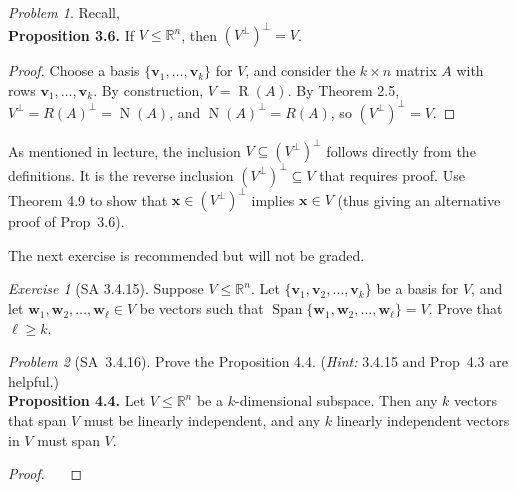 \documentclass[fleqn,11pt]{paper}
\theoremstyle{remark}
\newtheorem{problem}{Problem}
\newtheorem*{exercise}{Exercise}
\newtheorem*{solution}{{\bf Solution}}
\newcommand\R{\fld{R}}
\newcommand{\vR}{\ensuremath{\operatorname{R}}}
\newcommand{\vN}{\ensuremath{\operatorname{N}}}
\renewcommand{\vec}[1]{\mathbf{#1}}
\newcommand{\<}{\ensuremath{\langle}}
\renewcommand{\>}{\ensuremath{\rangle}}
\newcommand\fld[1]{\ensuremath{\mathbb{#1}}}
\newcommand\vv{\vec{v}}
\newcommand\vw{\vec{w}}
\newcommand\vx{\vec{x}}
\newcommand\Span{\ensuremath{\operatorname{Span}}}
\begin{document}
\newpage

\begin{problem} %
Recall,\\[4pt]
{\bf Proposition 3.6.} If $V \leq \R^n$, then $(V^\bot)^\bot= V$.
\begin{proof}
Choose a basis $\{\vv_1,\dots, \vv_k\}$ for $V$, and consider the 
$k \times n$ matrix $A$ with rows $\vv_1,\dots, \vv_k$. 
By construction, $V = \vR(A)$. By Theorem 2.5, $V^\bot = R(A)^\bot = \vN(A)$, 
and $\vN(A)^\bot = R(A)$, so $(V^\bot)^\bot = V$.
\end{proof}
As mentioned in lecture, the inclusion $V \subseteq (V^\bot)^\bot$ follows directly from the 
definitions.  It is the reverse inclusion $(V^\bot)^\bot \subseteq V$ that requires proof.
Use Theorem 4.9 to show that $\vx \in (V^\bot)^\bot$ implies $\vx \in V$ (thus giving
an alternative proof of Prop~3.6).
\end{problem}


\newpage

\noindent The next exercise is recommended but will not be graded.

\begin{exercise}[SA 3.4.15] 
Suppose $V \leq \R^n$. Let $\{\vv_1,\vv_2, \dots, \vv_k\}$ be a basis for $V$, and let 
$\vw_1,\vw_2, \dots, \vw_\ell \in V$ be vectors such that 
$\Span \{\vw_1, \vw_2, \dots, \vw_\ell\} = V$. Prove that $\ell \geq k$.
\end{exercise}

\newpage

\begin{problem}[SA~3.4.16]
Prove the Proposition 4.4. ({\it Hint:} 3.4.15 and Prop~4.3 are helpful.)  \\[4pt]
{\bf Proposition 4.4.} 
Let $V \leq \R^n$ be a $k$-dimensional subspace. 
Then any $k$ vectors that span $V$ must be linearly independent, 
and any $k$ linearly independent vectors in $V$ must span $V$.
\begin{proof}\
~
  \vfill
\end{proof}
\end{problem}
\newpage
\end{document}
